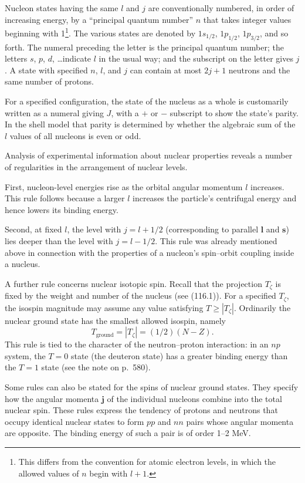 Nucleon states having the same $l$ and $j$ are conventionally numbered, in
order of increasing energy, by a ``principal quantum number'' $n$ that takes
integer values beginning with 1\footnote{This differs from the convention for
atomic electron levels, in which the allowed values of $n$ begin with
$l+1$.}. The various states are denoted by $1s_{1/2}$, $1p_{1/2}$,
$1p_{3/2}$, and so forth. The numeral preceding the letter is the principal
quantum number; the letters $s$, $p$, $d$, \ldots indicate $l$ in the usual
way; and the subscript on the letter gives $j$. A state with specified $n$,
$l$, and $j$ can contain at most $2j+1$ neutrons and the same number of
protons.

For a specified configuration, the state of the nucleus as a whole is
customarily written as a numeral giving $J$, with a $+$ or $-$ subscript to
show the state's parity. In the shell model that parity is determined by
whether the algebraic sum of the $l$ values of all nucleons is even or odd.

Analysis of experimental information about nuclear properties reveals a
number of regularities in the arrangement of nuclear levels.

First, nucleon-level energies rise as the orbital angular momentum $l$
increases. This rule follows because a larger $l$ increases the particle's
centrifugal energy and hence lowers its binding energy.

Second, at fixed $l$, the level with $j=l+1/2$ (corresponding to parallel
$\mathbf l$ and $\mathbf s$) lies deeper than the level with $j=l-1/2$. This
rule was already mentioned above in connection with the properties of a
nucleon's spin--orbit coupling inside a nucleus.

A further rule concerns nuclear isotopic spin. Recall that the projection
$T_\zeta$ is fixed by the weight and number of the nucleus (see (116.1)). For
a specified $T_\zeta$, the isospin magnitude may assume any value satisfying
$T\geqslant|T_\zeta|$. Ordinarily the nuclear ground state has the smallest
allowed isospin, namely
\begin{equation}
 T_{\text{ground}}=|T_\zeta|=(1/2)(N-Z).
 \tag{118.7}
\end{equation}
This rule is tied to the character of the neutron--proton interaction: in an
$np$ system, the $T=0$ state (the deuteron state) has a greater binding energy
than the $T=1$ state (see the note on p.~580).

Some rules can also be stated for the spins of nuclear ground states. They
specify how the angular momenta $\mathbf j$ of the individual nucleons combine
into the total nuclear spin. These rules express the tendency of protons and
neutrons that occupy identical nuclear states to form
$pp$ and $nn$ pairs whose angular momenta are opposite. The binding energy of
such a pair is of order 1--2 MeV.

